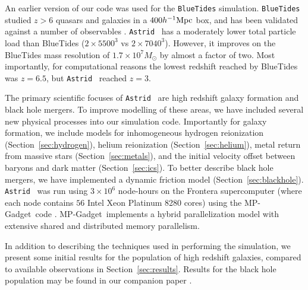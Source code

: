 \documentclass[fleqn,usenatbib]{mnras}
\newcommand{\software}[1]{{\small #1}}
\newcommand{\mpgadget}{\software{MP-Gadget}}
\def\astrid{\texttt{Astrid} }
\def\bluetides{\texttt{BlueTides} }
\def\hmpc{h^{-1}{\rm Mpc}}
\begin{document}
An earlier version of our code was used for the \bluetides simulation. \bluetides studied $z>6$ quasars and galaxies in a $400 \hmpc$ box, and has been validated against a number of observables \citep[e.g.][]{Feng:2016,Wilkins2017,DiMatteo2017,Tenneti2018,Huang2018,Ni2018,Bhowmick2018,Ni2020,Marshall2020,Marshall2021}. 
\astrid~has a moderately lower total particle load than BlueTides ($2\times 5500^3$ vs $2 \times 7040^3$). However, it improves on the BlueTides mass resolution of $1.7 \times 10^7 M_\odot$ by almost a factor of two. Most importantly, for computational reasons the lowest redshift reached by BlueTides was $z=6.5$, but \astrid~reached $z=3$.

The primary scientific focuses of \astrid~are high redshift galaxy formation and black hole mergers. To improve modelling of these areas, we have included several new physical processes into our simulation code. Importantly for galaxy formation, we include models for inhomogeneous hydrogen reionization (Section~\ref{sec:hydrogen}), helium reionization (Section~\ref{sec:helium}), metal return from massive stars (Section~\ref{sec:metals}), and the initial velocity offset between baryons and dark matter (Section~\ref{sec:ics}). To better describe black hole mergers, we have implemented a dynamic friction model (Section~\ref{sec:blackhole}). \astrid~was run using $3\times 10^6$ node-hours on the Frontera supercomputer (where each node contains $56$ Intel Xeon Platinum 8280 cores) using the \mpgadget~code \citep{MPGadget2018}. \mpgadget~implements a hybrid parallelization model with extensive shared and distributed memory parallelism.

In addition to describing the techniques used in performing the simulation, we present some initial results for the population of high redshift galaxies, compared to available observations in Section~\ref{sec:results}. Results for the black hole population may be found in our companion paper \citep{Ni:2021inprep}.
\end{document}
